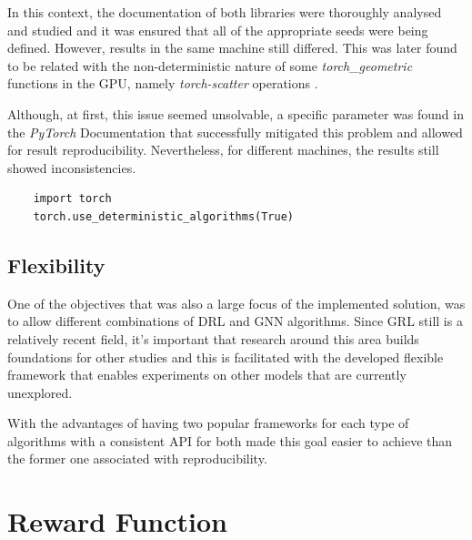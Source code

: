 In this context, the documentation of both libraries were thoroughly analysed and studied and it was ensured that all of the appropriate seeds were being defined. However, results in the same machine still differed. This was later found to be related with the non-deterministic nature of some \textit{torch\_geometric} functions in the GPU, namely \textit{torch-scatter} operations \cite{NotReproducibleSetting} \cite{ReproducibilityPyTorchDocumentation}. \par

Although, at first, this issue seemed unsolvable, a specific parameter was found in the \textit{PyTorch} Documentation \cite{ReproducibilityPyTorchDocumentation} that successfully mitigated this problem and allowed for result reproducibility. Nevertheless, for different machines, the results still showed inconsistencies. \par

\begin{lstlisting}
	import torch
	torch.use_deterministic_algorithms(True)
\end{lstlisting}

\subsection{Flexibility}

One of the objectives that was also a large focus of the implemented solution, was to allow different combinations of \ac{DRL} and \ac{GNN} algorithms. Since \ac{GRL} still is a relatively recent field, it's important that research around this area builds foundations for other studies and this is facilitated with the developed flexible framework that enables experiments on other models that are currently unexplored. \par
With the advantages of having two popular frameworks for each type of algorithms with a consistent API for both made this goal easier to achieve than the former one associated with reproducibility. \par


\section{Reward Function} \label{sec:results-rewards}

